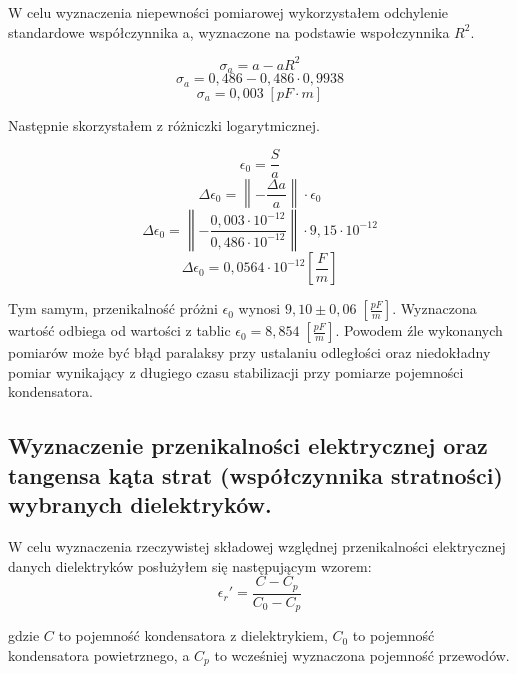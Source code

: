\documentclass[polish, a4paper]{article}
\begin{document}
W celu wyznaczenia niepewności pomiarowej wykorzystałem odchylenie standardowe współczynnika a, wyznaczone na podstawie wspołczynnika $R^2$.

\begin{equation}
\sigma_a = a - aR^2
\end{equation}
\begin{equation}
\sigma_a = 0,486 - 0,486 \cdot 0,9938
\end{equation}
\begin{equation}
\sigma_a = 0,003 \; [pF \cdot m]
\end{equation}

Następnie skorzystałem z różniczki logarytmicznej.

\begin{equation}
\epsilon_0 = \frac{S}{a}
\end{equation}
\begin{equation}
\Delta\epsilon_0 = \left\| - \frac{\Delta a}{a} \right\| \cdot \epsilon_0
\end{equation}
\begin{equation}
\Delta\epsilon_0 = \left\| - \frac{0,003 \cdot 10^{-12} }{0,486 \cdot 10^{-12}} \right\| \cdot 9,15 \cdot 10^{-12}
\end{equation}
\begin{equation}
\Delta\epsilon_0 = 0,0564 \cdot 10^{-12} [\frac{F}{m}]
\end{equation}

Tym samym, przenikalność próżni $\epsilon_0$ wynosi $9,10 \pm 0,06 \; [\frac{pF}{m}]$.
Wyznaczona wartość odbiega od wartości z tablic $\epsilon_0 = 8,854 \; [\frac{pF}{m}]$. Powodem źle wykonanych pomiarów może być błąd paralaksy przy ustalaniu odległości oraz niedokładny pomiar wynikający z długiego czasu stabilizacji przy pomiarze pojemności kondensatora.
\subsection{Wyznaczenie przenikalności elektrycznej oraz tangensa kąta strat (współczynnika stratności) wybranych dielektryków.}

W celu wyznaczenia rzeczywistej składowej względnej przenikalności elektrycznej danych dielektryków
posłużyłem się następującym wzorem:
\begin{equation}
\epsilon_r ' = \frac{C - C_p}{C_0 - C_p}
\end{equation}

gdzie $C$ to pojemność kondensatora z dielektrykiem, 
$C_0$ to pojemność kondensatora powietrznego, a $C_p$ to wcześniej wyznaczona pojemność przewodów.
\end{document}
